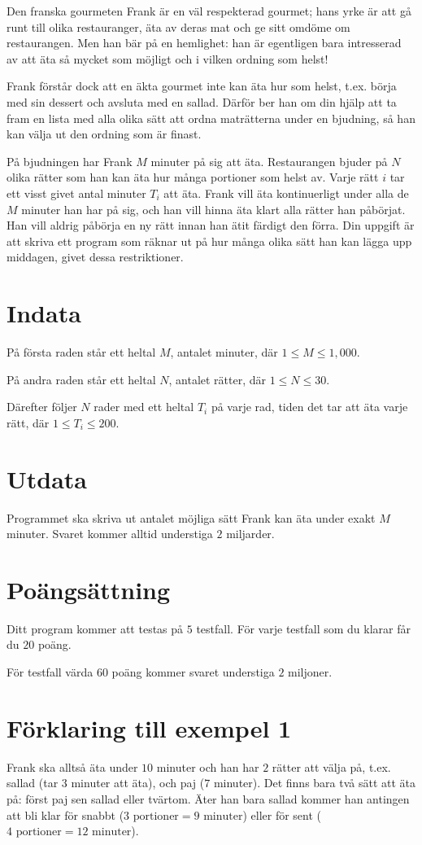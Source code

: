 Den franska gourmeten Frank är en väl respekterad gourmet; hans yrke är att gå runt till olika restauranger, äta av deras mat och ge sitt omdöme om restaurangen.
Men han bär på en hemlighet: han är egentligen bara intresserad av att äta så mycket som möjligt och i vilken ordning som helst!

Frank förstår dock att en äkta gourmet inte kan äta hur som helst, t.ex. börja med sin dessert och avsluta med en sallad.
Därför ber han om din hjälp att ta fram en lista med alla olika sätt att ordna maträtterna under en bjudning, så han kan välja ut den ordning som är finast.

På bjudningen har Frank $M$ minuter på sig att äta.
Restaurangen bjuder på $N$ olika rätter som han kan äta hur många portioner som helst av.
Varje rätt $i$ tar ett visst givet antal minuter $T_i$ att äta.
Frank vill äta kontinuerligt under alla de $M$ minuter han har på sig, och han vill hinna äta klart alla rätter han påbörjat.
Han vill aldrig påbörja en ny rätt innan han ätit färdigt den förra.
Din uppgift är att skriva ett program som räknar ut på hur många olika sätt han kan lägga upp middagen, givet dessa restriktioner.

\section*{Indata}
På första raden står ett heltal $M$, antalet minuter, där $1 \le M \le 1,000$.

På andra raden står ett heltal $N$, antalet rätter, där $1 \le N \le 30$.

Därefter följer $N$ rader med ett heltal $T_i$ på varje rad, tiden det tar att äta varje rätt, där $1 \le T_i \le 200$.

\section*{Utdata}
Programmet ska skriva ut antalet möjliga sätt Frank kan äta under exakt $M$ minuter.
Svaret kommer alltid understiga $2$ miljarder.

\section*{Poängsättning}
Ditt program kommer att testas på $5$ testfall.
För varje testfall som du klarar får du $20$ poäng.

För testfall värda $60$ poäng kommer svaret understiga $2$ miljoner.

\section*{Förklaring till exempel 1}
Frank ska alltså äta under $10$ minuter och han har $2$ rätter att välja på, t.ex. sallad (tar $3$ minuter att äta), och paj ($7$ minuter).
Det finns bara två sätt att äta på: först paj sen sallad eller tvärtom.
Äter han bara sallad kommer han antingen att bli klar för snabbt ($3 \text{ portioner} = 9 \text{ minuter}$) eller för sent ($4 \text{ portioner} = 12 \text{ minuter}$).
